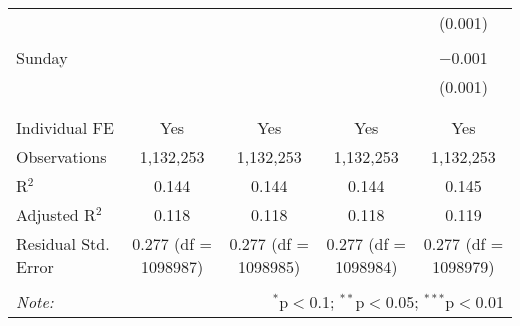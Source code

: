 \documentclass[
]{article}
\begin{document}
\begin{table}[!htbp]
{\begin{tabular}{@{\extracolsep{5pt}}lcccc}
  &  &  &  & (0.001) \\ 
  & & & & \\ 
 Sunday &  &  &  & $-$0.001 \\ 
  &  &  &  & (0.001) \\ 
  & & & & \\ 
\hline \\[-1.8ex] 
Individual FE & Yes & Yes & Yes & Yes \\ 
Observations & 1,132,253 & 1,132,253 & 1,132,253 & 1,132,253 \\ 
R$^{2}$ & 0.144 & 0.144 & 0.144 & 0.145 \\ 
Adjusted R$^{2}$ & 0.118 & 0.118 & 0.118 & 0.119 \\ 
Residual Std. Error & 0.277 (df = 1098987) & 0.277 (df = 1098985) & 0.277 (df = 1098984) & 0.277 (df = 1098979) \\ 
\hline 
\hline \\[-1.8ex] 
\textit{Note:}  & \multicolumn{4}{r}{$^{*}$p$<$0.1; $^{**}$p$<$0.05; $^{***}$p$<$0.01} \\ 
\end{tabular}
} 
\end{table} 
\newpage
\end{document}
